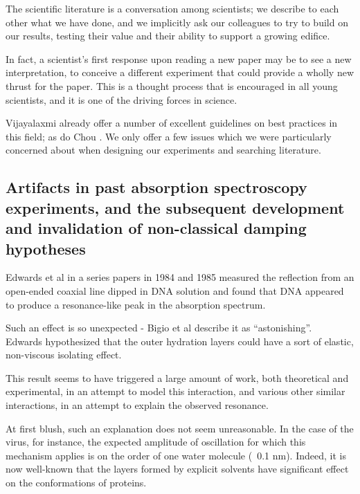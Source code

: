 \documentclass[paper.tex]{subfiles}
\begin{document}
\begin{fquote}
	The scientific literature is a conversation among scientists; we describe to each other what we have done, and we implicitly ask our colleagues to try to build on our results, testing their value and their ability to support a growing edifice.
	
	In fact, a scientist's first response upon reading a new paper may be to see a new interpretation, to conceive a different experiment that could provide a wholly new thrust for the paper. This is a thought process that is encouraged in all young scientists, and it is one of the driving forces in science.
\end{fquote}



\begin{multicols}{1}

Vijayalaxmi \cite{Biological2016} \cite{Comprehensive2018} \cite{Funding2019} already offer a number of excellent guidelines on best practices in this field; as do Chou \cite{chou1996radio}. We only offer a few issues which we were particularly concerned about when designing our experiments and searching literature. 


\subsection{Artifacts in past absorption spectroscopy experiments, and the subsequent development and invalidation of non-classical damping hypotheses}

Edwards et al in a series papers in 1984 and 1985 measured the reflection from an open-ended coaxial line dipped in DNA solution and found that DNA appeared to produce a resonance-like peak in the absorption spectrum.

Such an effect is so unexpected - Bigio et al describe it as “astonishing”. \\

Edwards hypothesized that the outer hydration layers could have a sort of elastic, non-viscous isolating effect.

This result seems to have triggered a large amount of work, both theoretical and experimental\cite{Structure1989}, in an attempt to model this interaction, and various other similar interactions, in an attempt to explain the observed resonance.

At first blush, such an explanation does not seem unreasonable. In the case of the virus, for instance, the expected amplitude of oscillation for which this mechanism applies is on the order of one water molecule (~0.1 nm). Indeed, it is now well-known that the layers formed by explicit solvents have significant effect on the conformations of proteins.


\end{multicols}
\end{document}
